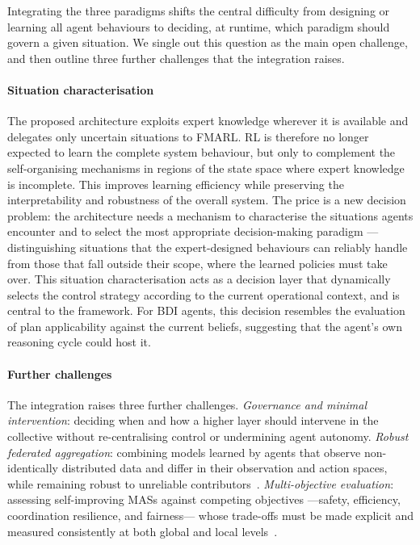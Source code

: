 Integrating the three paradigms shifts
the central difficulty from designing or learning all agent behaviours
to
deciding, at runtime,
which
paradigm should govern a given situation.
%
We single out this question as the main open challenge,
and
then outline three further challenges that the integration raises.

\paragraph{Situation characterisation}
The proposed architecture exploits
expert knowledge wherever it is available
and
delegates only uncertain situations to \ac{FMARL}.
%
\ac{RL}
is therefore no longer expected to learn the complete system behaviour,
but only to complement the self-organising mechanisms
in regions of the state space where expert knowledge is incomplete.
%
This improves learning efficiency
while
preserving the interpretability and robustness of the overall system.
%
The price is a new decision problem:
the architecture needs a mechanism to
characterise the situations agents encounter
and to
select the most appropriate decision-making paradigm%
---distinguishing situations that the expert-designed behaviours can reliably handle
from those
that fall outside their scope,
where the learned policies must take over.
%
This situation characterisation acts as a decision layer
that dynamically selects the control strategy
according to the current operational context,
and
is central to the framework.
%
For \ac{BDI} agents,
this decision resembles the evaluation of plan applicability against the current beliefs,
suggesting that the agent's own reasoning cycle could host it.

\paragraph{Further challenges}
The integration raises three further challenges.
%
\emph{Governance and minimal intervention}:
deciding
when and how
a higher layer should intervene in the collective
without re-centralising control or undermining agent autonomy.
%
\emph{Robust federated aggregation}:
combining models learned by agents that observe non-identically distributed data
and
differ in their observation and action spaces,
while
remaining robust to unreliable contributors~\cite{kairouz2021advances,jing2025federated}.
%
\emph{Multi-objective evaluation}:
assessing self-improving \acp{MAS} against
competing objectives%
---safety, efficiency, coordination resilience, and fairness---%
whose trade-offs must be made explicit
and
measured consistently at both global and local levels~\cite{lange2025measurement}.

